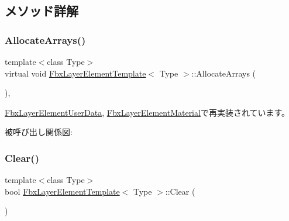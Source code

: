 \subsection{メソッド詳解}
\mbox{\label{class_fbx_layer_element_template_aa6d432c5865fcda1b58376119f1fcaa8}} 
\subsubsection{\texorpdfstring{Allocate\+Arrays()}{AllocateArrays()}}
{\footnotesize\ttfamily template$<$class Type$>$ \\
virtual void \hyperlink{class_fbx_layer_element_template}{Fbx\+Layer\+Element\+Template}$<$ Type $>$\+::Allocate\+Arrays (\begin{DoxyParamCaption}{ }\end{DoxyParamCaption})\hspace{0.3cm}{\ttfamily [protected]}, {\ttfamily [virtual]}}



\hyperlink{class_fbx_layer_element_user_data_afd9b9cec3547a1a5ccde15f274128d2a}{Fbx\+Layer\+Element\+User\+Data}, \hyperlink{class_fbx_layer_element_material_a5bf99bae72fa4a516eed88e04a66b7ff}{Fbx\+Layer\+Element\+Material}で再実装されています。

被呼び出し関係図\+:
\mbox{\label{class_fbx_layer_element_template_abe029dd81aa956b415b9534aa3536bf0}} 
\subsubsection{\texorpdfstring{Clear()}{Clear()}}
{\footnotesize\ttfamily template$<$class Type$>$ \\
bool \hyperlink{class_fbx_layer_element_template}{Fbx\+Layer\+Element\+Template}$<$ Type $>$\+::Clear (\begin{DoxyParamCaption}{ }\end{DoxyParamCaption})\hspace{0.3cm}{\ttfamily [virtual]}}

